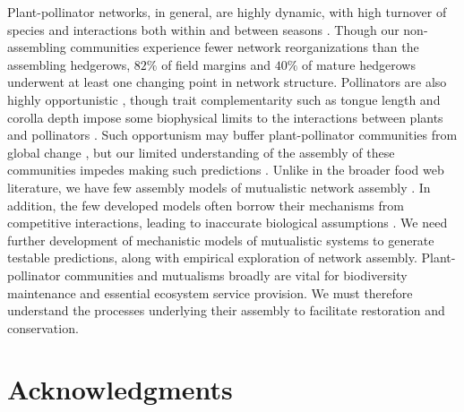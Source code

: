 \documentclass[12pt]{article}
\begin{document}

Plant-pollinator networks, in general, are highly dynamic, with high
turnover of species and interactions both within and between seasons
\citep{Burkle2011}. Though our non-assembling communities experience
fewer network reorganizations than the assembling hedgerows, $82\%$ of
field margins and $40\%$ of mature hedgerows underwent at least one
changing point in network structure. Pollinators are also highly
opportunistic \citep{petanidou-2008-564, Vazquez2005b,
  albrecht2010plant}, though trait complementarity such as tongue
length and corolla depth impose some biophysical limits to the
interactions between plants and pollinators
\citep{Vazquez2009evaluating, Vazquez2009, Stang2009, Stang2006,
  Santamaria2007}. Such opportunism may buffer plant-pollinator
communities from global change \citep[e.g.,][]{ramos2012topological,
  kaiser2010robustness}, but our limited understanding of the assembly
of these communities impedes making such predictions
\citep{Vazquez2009, Burkle2011}. Unlike in the broader food web
literature, we have few assembly models of mutualistic network
assembly \citep{valdovinos2013adaptive, Nuismer2013, Guimaraes2011}.
In addition, the few developed models often borrow their mechanisms
from competitive interactions, leading to inaccurate biological
assumptions \citep{holland2006comment}. We need further development of
mechanistic models of mutualistic systems to generate testable
predictions, along with empirical exploration of network
assembly. Plant-pollinator communities and mutualisms broadly are
vital for biodiversity maintenance and essential ecosystem service
provision. We must therefore understand the processes underlying their
assembly to facilitate restoration and conservation.

\section*{Acknowledgments}
\label{sec:acknowledge}
\end{document}
